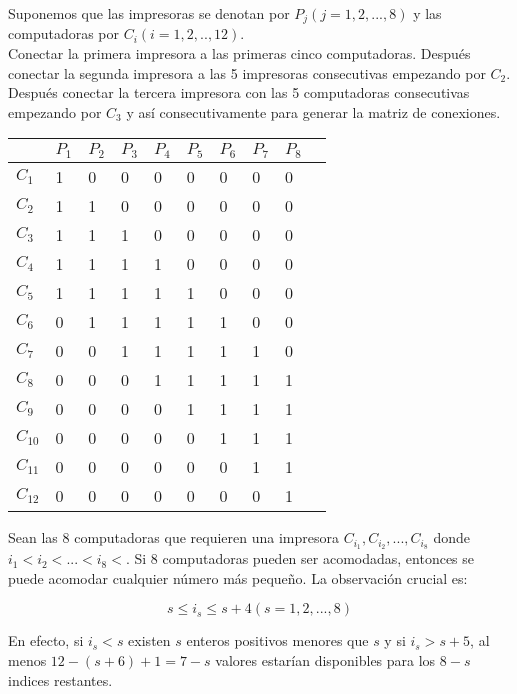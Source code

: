 Suponemos que las impresoras se denotan por $P_{j} (j=1,2,...,8)$ y las
computadoras por $C_{i} (i=1,2,..,12)$.\\

Conectar la primera impresora a las primeras cinco computadoras. Despu\'es
conectar la segunda impresora a las 5 impresoras consecutivas empezando por
$C_{2}$. Despu\'es conectar la tercera impresora con las 5 computadoras
consecutivas empezando por $C_{3}$ y as\'i consecutivamente para generar la
matriz de conexiones.

\begin{table}[h!]
    \centering
	\begin{tabular}{l|lllllllll}
		       &$P_{1}$&$P_{2}$&$P_{3}$ &$P_{4}$&$P_{5}$&$P_{6}$&$P_{7}$&$P_{8}$&\\\hline
		$C_{1}$&  1&  0&  0&   0& 	 0&   0&   0&  0&\\ 
		$C_{2}$&  1&  1&  0&   0& 	 0&   0&   0&  0&\\
		$C_{3}$&  1&  1&  1&   0& 	 0&   0&   0&  0&\\
		$C_{4}$&  1&  1&  1&   1& 	 0&   0&   0&  0&\\
		$C_{5}$&  1&  1&  1&   1& 	 1&   0&   0&  0&\\
		$C_{6}$&  0&  1&  1&   1& 	 1&   1&   0&  0&\\
		$C_{7}$&  0&  0&  1&   1& 	 1&   1&   1&  0&\\
		$C_{8}$&  0&  0&  0&   1& 	 1&   1&   1&  1&\\
		$C_{9}$&  0&  0&  0&   0& 	 1&   1&   1&  1&\\
		$C_{10}$&  0&  0&  0&   0& 	 0&   1&   1&  1&\\
		$C_{11}$&  0&  0&  0&   0& 	 0&   0&   1&  1&\\
		$C_{12}$&  0&  0&  0&   0& 	 0&   0&   0&  1&\\
	\end{tabular}
\end{table}

Sean las 8 computadoras que requieren una impresora $C_{i_{1}}, C_{i_{2}},...,
C_{i_{8}}$ donde $i_{1} <i_{2}<...<i_{8} < $. Si 8 computadoras pueden ser
acomodadas, entonces se puede acomodar cualquier n\'umero m\'as peque\~no. La
observaci\'on crucial es:

\begin{equation}
	s \leq i_{s} \leq s+4   (s=1,2,...,8)
\end{equation}

En efecto, si $i_{s} < s$ existen $s$ enteros positivos menores que $s$ y si
$i_{s} > s+5$, al menos $12-(s+6)+1=7-s$ valores estar\'ian disponibles para los
$8-s$ indices restantes.\\



